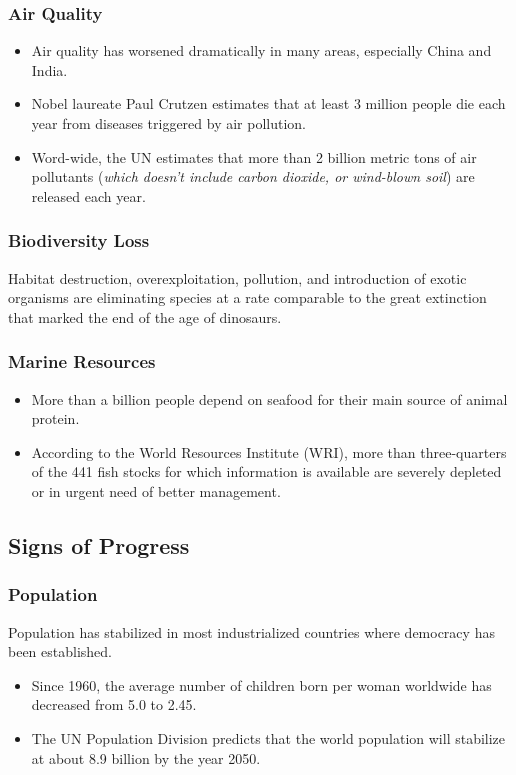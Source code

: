 \documentclass[10pt]{article}
\begin{document}
\subsubsection{Air Quality}
\begin{itemize}
    \item Air quality has worsened dramatically in many areas, especially China and India.
    \item Nobel laureate Paul Crutzen estimates that at least 3 million people die each year from diseases triggered by air pollution.
    \item Word-wide, the UN estimates that more than 2 billion metric tons of air pollutants (\textit{which doesn't include carbon dioxide, or wind-blown soil}) are released each year.
\end{itemize}

\subsubsection{Biodiversity Loss}
Habitat destruction, overexploitation, pollution, and introduction of exotic organisms are eliminating species at a rate comparable to the great extinction that marked the end of the age of dinosaurs.

\subsubsection{Marine Resources}
\begin{itemize}
    \item More than a billion people depend on seafood for their main source of animal protein.
    \item According to the World Resources Institute (WRI), more than three-quarters of the 441 fish stocks for which information is available are severely depleted or in urgent need of better management. 
\end{itemize}

\subsection{Signs of Progress}
\subsubsection{Population}
Population has stabilized in most industrialized countries where democracy has been established. 
\begin{itemize}
    \item Since 1960, the average number of children born per woman worldwide has decreased from 5.0 to 2.45. 
    \item The UN Population Division predicts that the world population will stabilize at about 8.9 billion by the year 2050.
\end{itemize}
\end{document}
